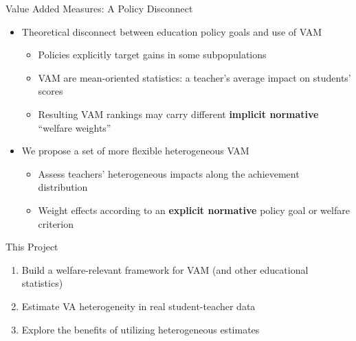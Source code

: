 \documentclass[11pt]{beamer}
\begin{document}

\begin{frame}{Value Added Measures: A Policy Disconnect}

\begin{itemize}
    \item Theoretical disconnect between education policy goals and use of VAM 
    \begin{itemize}
        \item Policies explicitly target gains in some subpopulations
        \item VAM are mean-oriented statistics: a teacher's average impact on students' scores
        \item Resulting VAM rankings may carry different \textbf{implicit normative} ``welfare weights''
    \end{itemize}
    
    \item  We propose a set of more flexible heterogeneous VAM 
    \begin{itemize}
        \item Assess teachers' heterogeneous impacts along the achievement distribution
        \item  Weight effects according to an \textbf{explicit normative} policy goal or welfare criterion
    \end{itemize}
\end{itemize}

\end{frame}



\begin{frame}{This Project}

\begin{enumerate}
    \item Build a welfare-relevant framework for VAM (and other educational statistics)
    \item Estimate VA heterogeneity in real student-teacher data
    \item Explore the benefits of utilizing heterogeneous estimates
\end{enumerate}

\end{frame}
\end{document}

